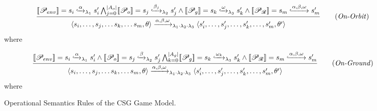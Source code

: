 \begin{figure}[th]
\begin{boxD}
	      \begin{equation}\label{s1} \frac{ \sset{\mathcal{P}_{env}}= s_{i}\gparrow{\alpha}_{\lambda_{1}}s'_{i}  \bigwedge_{j=0}^{|A_{o}|}  \sset{\mathcal{P}_{o}}= s_{j} \gparrow{\beta_{j}}_{\lambda_{2}}s'_{j}  \wedge
       \sset{\mathcal{P}_{g}}= s_{k}\gparrow{\omega}_{\lambda_{3}} s'_{k} 
       \wedge
         \sset{\mathcal{P}_{\mathcal{R}}}= s_{m}\gparrow{\alpha,\beta,\omega}s'_{m}
       } {  \langle s_{i},\ldots,s_{j},\ldots s_{k}, \ldots s_{m},\theta\rangle  \xrightarrow{\alpha,\beta,\omega}_{\lambda_{1} \cdot \lambda_{2} \cdot \lambda_{3}}\langle s'_{i},\ldots,s'_{j},\ldots,s'_{k},\ldots,s'_{m},\theta'\rangle } \tag{\emph{On-Orbit}} \end{equation} where 
 
	     \begin{equation}\label{s2} \frac{ \sset{\mathcal{P}_{env}}= s_{i}\gparrow{\alpha}_{\lambda_{1}}s'_{i} \wedge \sset{\mathcal{P}_{o}}= s_{j} \gparrow{\beta}_{\lambda_{2}}s'_{j} \bigwedge_{k=0}^{|A_{g}|} 
       \sset{\mathcal{P}_{g}}= s_{k}\gparrow{\omega_{k}}_{\lambda_{3}} s'_{k} 
       \wedge
         \sset{\mathcal{P}_{\mathcal{R}}}= s_{m}\gparrow{\alpha,\beta,\omega}s'_{m} 
       } {  \langle s_{i},\ldots,s_{j},\ldots s_{k}, \ldots s_{m},\theta\rangle  \xrightarrow{\alpha,\beta,\omega}_{\lambda_{1} \cdot \lambda_{2} \cdot \lambda_{3}}\langle s'_{i},\ldots,s'_{j},\ldots,s'_{k},\ldots,s'_{m},\theta'\rangle}  \tag{\emph{On-Ground}} \end{equation} where 
\end{boxD}
\label{op:sec}
 \caption{Operational Semantics Rules of the CSG Game Model.}
\end{figure}


